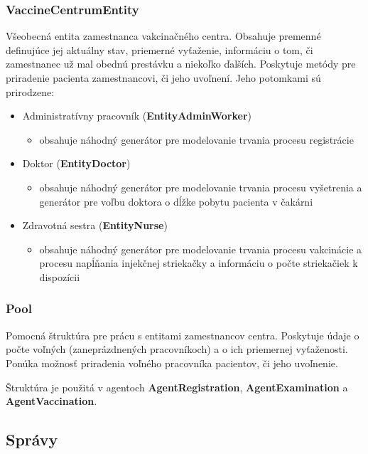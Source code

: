 \documentclass[letterpaper]{article}
\begin{document}
	\subsubsection{VaccineCentrumEntity}
	
	Všeobecná entita zamestnanca vakcinačného centra. Obsahuje premenné definujúce jej aktuálny stav, priemerné vyťaženie, informáciu o tom, či zamestnanec už mal obednú prestávku a niekoľko ďalších. Poskytuje metódy pre priradenie pacienta zamestnancovi, či jeho uvoľnení. Jeho potomkami sú prirodzene:
	\begin{itemize}
		\item Administratívny pracovník (\textbf{EntityAdminWorker})
		\begin{itemize}
			\item obsahuje náhodný generátor pre modelovanie trvania procesu registrácie
		\end{itemize}
		\item Doktor (\textbf{EntityDoctor})
		\begin{itemize}
			\item obsahuje náhodný generátor pre modelovanie trvania procesu vyšetrenia a generátor pre voľbu doktora o dĺžke pobytu pacienta v čakárni
		\end{itemize}
		\item Zdravotná sestra (\textbf{EntityNurse})
		\begin{itemize}
			\item obsahuje náhodný generátor pre modelovanie trvania procesu vakcinácie a procesu napĺňania injekčnej striekačky a informáciu o počte striekačiek k dispozícii
		\end{itemize}
	\end{itemize}

	\subsubsection{Pool}
	
	Pomocná štruktúra pre prácu s entitami zamestnancov centra. Poskytuje údaje o počte voľných (zaneprázdnených pracovníkoch) a o ich priemernej vyťaženosti. Ponúka možnosť priradenia voľného pracovníka pacientov, či jeho uvoľnenie.
	
	Štruktúra je použitá v agentoch \textbf{AgentRegistration}, \textbf{AgentExamination} a \textbf{AgentVaccination}.
	
	\subsection{Správy}
	
\end{document}
